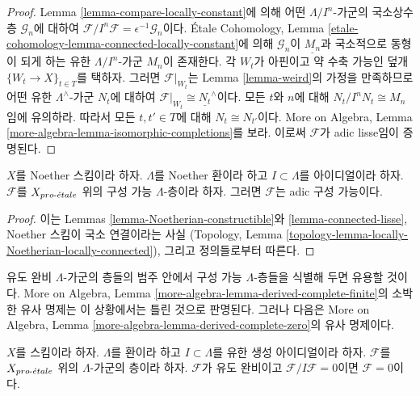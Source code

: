 \begin{proof}
Lemma \ref{lemma-compare-locally-constant}에 의해 어떤
$\Lambda/I^n$-가군의 국소상수 층 $\mathcal{G}_n$에 대하여
$\mathcal{F}/I^n\mathcal{F} = \epsilon^{-1}\mathcal{G}_n$이다.
\'Etale Cohomology, Lemma
\ref{etale-cohomology-lemma-connected-locally-constant}에 의해
$\mathcal{G}_n$이 $\underline{M_n}$과 국소적으로 동형이 되게 하는
유한 $\Lambda/I^n$-가군 $M_n$이 존재한다. 각 $W_t$가 아핀이고 약
수축 가능인 덮개 $\{W_t \to X\}_{t \in T}$를 택하자. 그러면
$\mathcal{F}|_{W_t}$는 Lemma \ref{lemma-weird}의 가정을 만족하므로
어떤 유한 $\Lambda^\wedge$-가군 $N_t$에 대하여
$\mathcal{F}|_{W_t} \cong \underline{N_t}^\wedge$이다. 모든 $t$와
$n$에 대해 $N_t/I^nN_t \cong M_n$임에 유의하라. 따라서 모든
$t, t' \in T$에 대해 $N_t \cong N_{t'}$이다. More on Algebra,
Lemma \ref{more-algebra-lemma-isomorphic-completions}를 보라. 이로써
$\mathcal{F}$가 adic lisse임이 증명된다.
\end{proof}

\begin{lemma}
\label{lemma-Noetherian-adic-constructible}
$X$를 Noether 스킴이라 하자. $\Lambda$를 Noether 환이라 하고
$I \subset \Lambda$를 아이디얼이라 하자. $\mathcal{F}$를
$X_{pro\text{-}\acute{e}tale}$ 위의 구성 가능 $\Lambda$-층이라 하자. 그러면
$\mathcal{F}$는 adic 구성 가능이다.
\end{lemma}

\begin{proof}
이는 Lemmas \ref{lemma-Noetherian-constructible}와
\ref{lemma-connected-lisse}, Noether 스킴이 국소 연결이라는 사실
(Topology, Lemma
\ref{topology-lemma-locally-Noetherian-locally-connected}), 그리고
정의들로부터 따른다.
\end{proof}

\noindent
유도 완비 $\Lambda$-가군의 층들의 범주 안에서 구성 가능
$\Lambda$-층들을 식별해 두면 유용할 것이다. More on Algebra, Lemma
\ref{more-algebra-lemma-derived-complete-finite}의 소박한 유사 명제는 이
상황에서는 틀린 것으로 판명된다. 그러나 다음은 More on Algebra,
Lemma \ref{more-algebra-lemma-derived-complete-zero}의 유사 명제이다.

\begin{lemma}
\label{lemma-derived-complete-zero}
$X$를 스킴이라 하자. $\Lambda$를 환이라 하고
$I \subset \Lambda$를 유한 생성 아이디얼이라 하자. $\mathcal{F}$를
$X_{pro\text{-}\acute{e}tale}$ 위의 $\Lambda$-가군의 층이라 하자. $\mathcal{F}$가 유도
완비이고 $\mathcal{F}/I\mathcal{F} = 0$이면 $\mathcal{F} = 0$이다.
\end{lemma}

